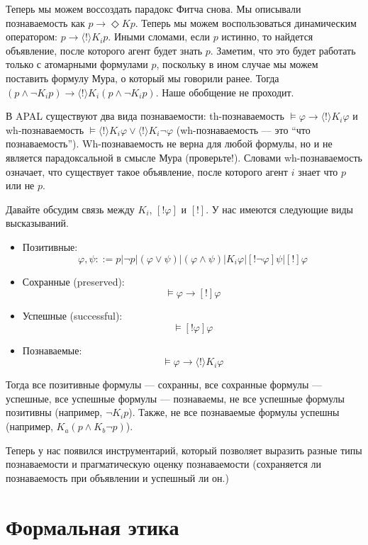 \documentclass[openany]{book}
\theoremstyle{plain}
\theoremstyle{definition}
\begin{document}
Теперь мы можем воссоздать парадокс Фитча снова. Мы описывали познаваемость как \(p \to \Diamond K p\). Теперь мы можем воспользоваться динамическим оператором: \(p \to \langle ! \rangle K_i p\). Иными сломами, если \(p\) истинно, то найдется объявление, после которого агент будет знать \(p\). Заметим, что это будет работать только с атомарными формулами \(p\), поскольку в ином случае мы можем поставить формулу Мура, о который мы говорили ранее. Тогда \((p \land \neg K_i p) \to \langle ! \rangle K_i (p \land \neg K_i p)\). Наше обобщение не проходит.

В APAL существуют два вида познаваемости: th-познаваемость \(\models \varphi \to \langle ! \rangle K_i \varphi\) и wh-познаваемость \(\models \langle ! \rangle K_i \varphi \lor \langle ! \rangle K_i \neg \varphi\) (wh-познаваемость --- это ``что познаваемость''). Wh-познаваемость не верна для любой формулы, но и не является парадоксальной в смысле Мура (проверьте!). Словами wh-познаваемость означает, что существует такое объявление, после которого агент \(i\) знает что \(p\) или не \(p\).

Давайте обсудим связь между \(K_i\), \([! \varphi]\) и \([!]\). У нас имеются следующие виды высказываний. 
\begin{itemize}
\item Позитивные: \[\varphi, \psi ::= p | \neg p | (\varphi \lor \psi) | (\varphi \land \psi) | K_i \varphi | [!\neg\varphi] \psi | [!] \varphi\]
\item Сохранные (preserved): \[\models \varphi \to [!] \varphi\]
\item Успешные (successful): \[\models [! \varphi] \varphi\]
\item Познаваемые: \[\models \varphi \to \langle ! \rangle K_i \varphi\]
\end{itemize}

Тогда все позитивные формулы --- сохранны, все сохранные формулы --- успешные, все успешные формулы --- познаваемы, не все успешные формулы позитивны (например, \(\neg K_i p\)). Также, не все познаваемые формулы успешны (например, \(K_a (p \land K_b \neg p)\)).

Теперь у нас появился инструментарий, который позволяет выразить разные типы познаваемости и прагматическую оценку познаваемости (сохраняется ли познаваемость при объявлении и успешный ли он.)

\chapter{Формальная этика}
\end{document}
